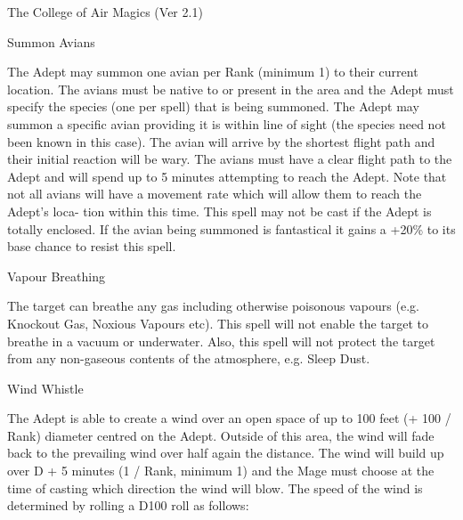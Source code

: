 \begin{Chapter}{The College of Air Magics (Ver 2.1)}
\begin{spell}[G-7]{Summon Avians}

\begin{effects}
The Adept may summon one avian per Rank (minimum 1) to their current
location.  The avians must be native to or present in the area and the
Adept must specify the species (one per spell) that is being summoned.
The Adept may summon a specific avian providing it is within line of
sight (the species need not been known in this case). The avian will
arrive by the shortest flight path and their initial reaction will be
wary. The avians must have a clear flight path to the Adept and will
spend up to 5 minutes attempting to reach the Adept.  Note that not
all avians will have a movement rate which will allow them to reach
the Adept’s loca- tion within this time. This spell may not be cast if
the Adept is totally enclosed.  If the avian being summoned is
fantastical it gains a +20\% to its base chance to resist this spell.
\end{effects}
\end{spell}

\begin{spell}[G-8]{Vapour Breathing}

\begin{effects}
The target can breathe any gas including otherwise poisonous vapours
(e.g.  Knockout Gas, Noxious Vapours etc).  This spell will not enable
the target to breathe in a vacuum or underwater.  Also, this spell
will not protect the target from any non-gaseous contents of the
atmosphere, e.g. Sleep Dust.
\end{effects}
\end{spell}

\begin{spell}[G-9]{Wind Whistle}

\begin{effects}
The Adept is able to create a wind over an open space of up to 100
feet (+ 100 / Rank) diameter centred on the Adept.  Outside of this
area, the wind will fade back to the prevailing wind over half again
the distance. The wind will build up over D + 5 minutes (1 / Rank,
minimum 1) and the Mage must choose at the time of casting which
direction the wind will blow.  The speed of the wind is determined by
rolling a D100 roll as follows:


\end{effects}
\end{spell}
\end{Chapter}

